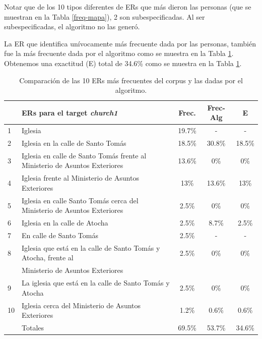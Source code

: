 Notar que de los 10 tipos diferentes de ERs que m\'as dieron las personas (que se muestran en la Tabla \ref{freq-mapa}), 
2 son subespecificadas. Al ser subespecificadas, el algoritmo no las gener\'o. 

La ER que identifica un\'ivocamente m\'as frecuente dada por las personas, tambi\'en fue la m\'as frecuente dada por el algoritmo como se muestra en la Tabla \ref{compara-corpus-alg}. Obtenemos una exactitud (E) total de 34.6\% como se muestra en la Tabla \ref{compara-corpus-alg}.

\begin{table}[H]
{\footnotesize
\begin{center}
\begin{tabular}{|l|l|c|c|c|}
\hline
&ERs para el target {\it church1} 					      &  Frec. & Frec-Alg &E\\ \hline \hline
1&Iglesia 								 &19.7\%  &  -&-\\ \hline
2&Iglesia en la calle de Santo Tom\'as						 &18.5\% 	& 30.8\%  &18.5\% \\ \hline
3&Iglesia en calle de Santo Tom\'as frente al Ministerio de Asuntos Exteriores        &13.6\% & 0\%& 0\% \\ \hline
4&Iglesia frente al Ministerio de Asuntos Exteriores 			 &13\% & 13.6\% & 13\% \\ \hline
5&Iglesia en calle Santo Tom\'as cerca del Ministerio de Asuntos Exteriores        &2.5\% & 0\% & 0\% \\ \hline
6&Iglesia en la calle de Atocha							&2.5\%  &8.7\% & 2.5\% \\ \hline
7&En calle de Santo Tom\'as 							&2.5\% 	& -  &-\\ \hline
8&Iglesia que est\'a en la calle de Santo Tom\'as y Atocha, frente al 	 &2.5\%	& 0\% &0\% \\ 
&Ministerio de Asuntos Exteriores						 && &\\ \hline
9&La iglesia que est\'a en la calle de Santo Tom\'as y Atocha			 &2.5\% 	& 0\%&  0\% \\ \hline
10&Iglesia cerca del Ministerio de Asuntos Exteriores				 &1.2\% 	&0.6\% & 0.6\% \\ \hline \hline

&Totales &69.5\%&53.7\%&34.6\% \\ \hline
\end{tabular}
\caption{Comparaci\'on de las 10 ERs m\'as frecuentes del corpus y las dadas por el algoritmo.}\label{compara-corpus-alg}
\end{center}
}
\end{table}


